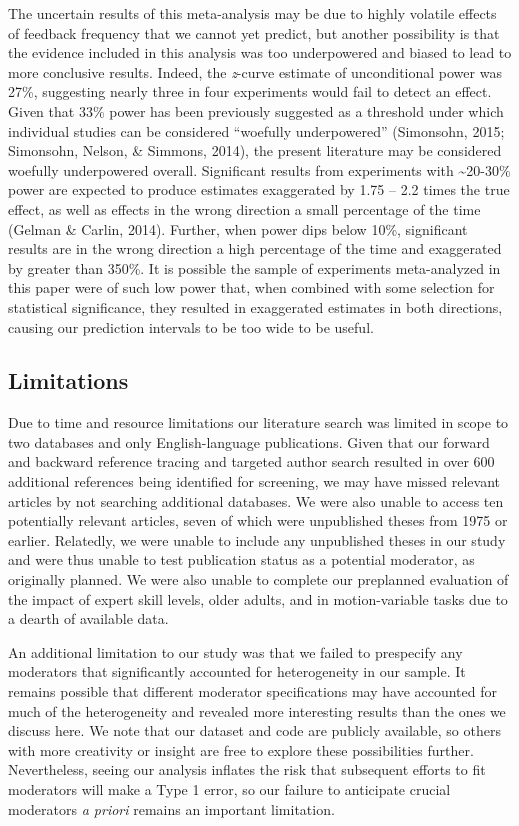 \documentclass[
  english,
  man, donotrepeattitle,mask,floatsintext]{apa7}
\begin{document}
The uncertain results of this meta-analysis may be due to highly volatile effects of feedback frequency that we cannot yet predict, but another possibility is that the evidence included in this analysis was too underpowered and biased to lead to more conclusive results. Indeed, the \emph{z}-curve estimate of unconditional power was 27\%, suggesting nearly three in four experiments would fail to detect an effect. Given that 33\% power has been previously suggested as a threshold under which individual studies can be considered ``woefully underpowered'' (Simonsohn, 2015; Simonsohn, Nelson, \& Simmons, 2014), the present literature may be considered woefully underpowered overall. Significant results from experiments with \textasciitilde20-30\% power are expected to produce estimates exaggerated by 1.75 -- 2.2 times the true effect, as well as effects in the wrong direction a small percentage of the time (Gelman \& Carlin, 2014). Further, when power dips below 10\%, significant results are in the wrong direction a high percentage of the time and exaggerated by greater than 350\%. It is possible the sample of experiments meta-analyzed in this paper were of such low power that, when combined with some selection for statistical significance, they resulted in exaggerated estimates in both directions, causing our prediction intervals to be too wide to be useful.

\hypertarget{limitations}{%
\subsection{Limitations}\label{limitations}}

Due to time and resource limitations our literature search was limited in scope to two databases and only English-language publications. Given that our forward and backward reference tracing and targeted author search resulted in over 600 additional references being identified for screening, we may have missed relevant articles by not searching additional databases. We were also unable to access ten potentially relevant articles, seven of which were unpublished theses from 1975 or earlier. Relatedly, we were unable to include any unpublished theses in our study and were thus unable to test publication status as a potential moderator, as originally planned. We were also unable to complete our preplanned evaluation of the impact of expert skill levels, older adults, and in motion-variable tasks due to a dearth of available data.

An additional limitation to our study was that we failed to prespecify any moderators that significantly accounted for heterogeneity in our sample. It remains possible that different moderator specifications may have accounted for much of the heterogeneity and revealed more interesting results than the ones we discuss here. We note that our dataset and code are publicly available, so others with more creativity or insight are free to explore these possibilities further. Nevertheless, seeing our analysis inflates the risk that subsequent efforts to fit moderators will make a Type 1 error, so our failure to anticipate crucial moderators \emph{a priori} remains an important limitation.
\end{document}
